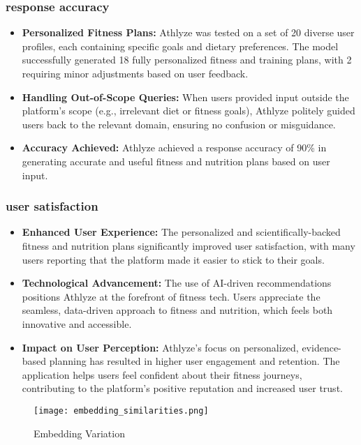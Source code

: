 \documentclass[conference]{IEEEtran}
\begin{document}
\subsubsection{response accuracy}

\begin{itemize}
    \item \textbf{Personalized Fitness Plans:} Athlyze was tested on a set of 20 diverse user profiles, each containing specific goals and dietary preferences. The model successfully generated 18 fully personalized fitness and training plans, with 2 requiring minor adjustments based on user feedback.
    \item \textbf{Handling Out-of-Scope Queries:} When users provided input outside the platform's scope (e.g., irrelevant diet or fitness goals), Athlyze politely guided users back to the relevant domain, ensuring no confusion or misguidance.
    \item \textbf{Accuracy Achieved:} Athlyze achieved a response accuracy of 90\% in generating accurate and useful fitness and nutrition plans based on user input.
\end{itemize}

\subsubsection{user satisfaction}

\begin{itemize}
    \item \textbf{Enhanced User Experience:} The personalized and scientifically-backed fitness and nutrition plans significantly improved user satisfaction, with many users reporting that the platform made it easier to stick to their goals.
    \item \textbf{Technological Advancement:} The use of AI-driven recommendations positions Athlyze at the forefront of fitness tech. Users appreciate the seamless, data-driven approach to fitness and nutrition, which feels both innovative and accessible.
    \item \textbf{Impact on User Perception:} Athlyze's focus on personalized, evidence-based planning has resulted in higher user engagement and retention. The application helps users feel confident about their fitness journeys, contributing to the platform's positive reputation and increased user trust.
\end{itemize}

\begin{figure}[h!]
    \centering
    \texttt{[image: embedding\_similarities.png]}
    \caption{Embedding Variation}
    \label{fig:RAG}
\end{figure}
\end{document}
